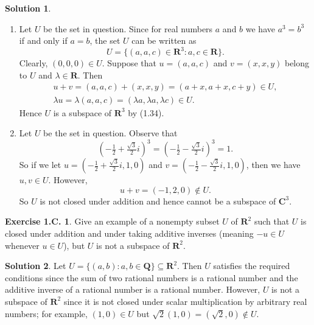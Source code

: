 \documentclass[12pt]{article}
\theoremstyle{definition}
\theoremstyle{exercise}
\newtheorem{exercise}{Exercise 1.C.}
\theoremstyle{solution}
\newtheorem*{solution}{Solution}
\newcommand{\Q}{\mathbf{Q}}
\newcommand{\R}{\mathbf{R}}
\newcommand{\C}{\mathbf{C}}
\begin{document}
\begin{solution}
    \begin{enumerate}
        \item Let \( U \) be the set in question. Since for real numbers \( a \) and \( b \) we have \( a^3 = b^3 \) if and only if \( a = b \), the set \( U \) can be written as
        \[
            U = \{ (a, a, c) \in \R^3 : a, c \in \R \}.
        \]
        Clearly, \( (0, 0, 0) \in U \). Suppose that \( u = (a, a, c) \) and \( v = (x, x, y) \) belong to \( U \) and \( \lambda \in \R \). Then
        \begin{gather*}
            u + v = (a, a, c) + (x, x, y) = (a + x, a + x, c + y) \in U, \\[2mm]
            \lambda u = \lambda (a, a, c) = (\lambda a, \lambda a, \lambda c) \in U.
        \end{gather*}
        Hence \( U \) is a subspace of \( \R^3 \) by (1.34).

        \item Let \( U \) be the set in question. Observe that
        \[
            \left( -\tfrac{1}{2} + \tfrac{\sqrt{3}}{2} i \right)^3 = \left( -\tfrac{1}{2} - \tfrac{\sqrt{3}}{2} i \right)^3 = 1.
        \]
        So if we let \( u = \left( -\tfrac{1}{2} + \tfrac{\sqrt{3}}{2} i, 1, 0 \right) \) and \( v = \left( -\tfrac{1}{2} - \tfrac{\sqrt{3}}{2} i, 1, 0 \right) \), then we have \( u, v \in U \). However,
        \[
            u + v = (-1, 2, 0) \not\in U.
        \]
        So \( U \) is not closed under addition and hence cannot be a subspace of \( \C^3 \).
    \end{enumerate}
\end{solution}

\begin{exercise}
\label{ex:7}
    Give an example of a nonempty subset \( U \) of \( \R^2 \) such that \( U \) is closed under addition and under taking additive inverses (meaning \( - u \in U \) whenever \( u \in U \)), but \( U \) is not a subspace of \( \R^2 \).    
\end{exercise}

\begin{solution}
    Let \( U = \{ (a, b) : a, b \in \Q \} \subseteq \R^2 \). Then \( U \) satisfies the required conditions since the sum of two rational numbers is a rational number and the additive inverse of a rational number is a rational number. However, \( U \) is not a subspace of \( \R^2 \) since it is not closed under scalar multiplication by arbitrary real numbers; for example, \( (1, 0) \in U \) but \( \sqrt{2} (1, 0) = \left( \sqrt{2}, 0 \right) \not\in U \).
\end{solution}
\end{document}
